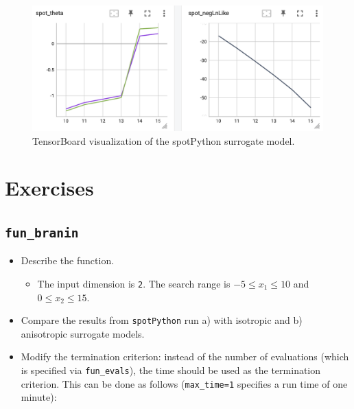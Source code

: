 \documentclass[
  letterpaper,
  DIV=11,
  numbers=noendperiod]{scrreprt}
\providecommand{\tightlist}{%
  \setlength{\itemsep}{0pt}\setlength{\parskip}{0pt}}\usepackage{longtable,booktabs,array}
\begin{document}
\begin{figure}[H]

{\centering \includegraphics[width=1\textwidth,height=\textheight]{figures_static/03_tensorboard_03.png}

}

\caption{TensorBoard visualization of the spotPython surrogate model.}

\end{figure}%

\section{Exercises}\label{exercises-3}

\subsection{\texorpdfstring{\texttt{fun\_branin}}{fun\_branin}}\label{fun_branin}

\begin{itemize}
\tightlist
\item
  Describe the function.

  \begin{itemize}
  \tightlist
  \item
    The input dimension is \texttt{2}. The search range is
    \(-5 \leq x_1 \leq 10\) and \(0 \leq x_2 \leq 15\).
  \end{itemize}
\item
  Compare the results from \texttt{spotPython} run a) with isotropic and
  b) anisotropic surrogate models.
\item
  Modify the termination criterion: instead of the number of evaluations
  (which is specified via \texttt{fun\_evals}), the time should be used
  as the termination criterion. This can be done as follows
  (\texttt{max\_time=1} specifies a run time of one minute):
\end{itemize}
\end{document}
